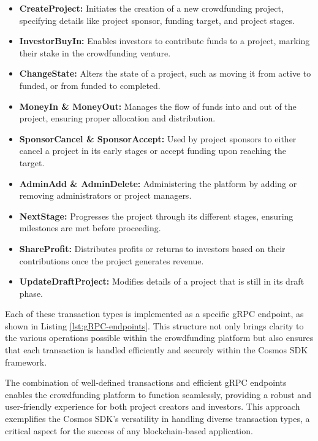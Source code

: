 \begin{itemize}
    \item \textbf{CreateProject:} Initiates the creation of a new crowdfunding project, specifying details like project sponsor, funding target, and project stages.
    \item \textbf{InvestorBuyIn:} Enables investors to contribute funds to a project, marking their stake in the crowdfunding venture.
    \item \textbf{ChangeState:} Alters the state of a project, such as moving it from active to funded, or from funded to completed.
    \item \textbf{MoneyIn \& MoneyOut:} Manages the flow of funds into and out of the project, ensuring proper allocation and distribution.
    \item \textbf{SponsorCancel \& SponsorAccept:} Used by project sponsors to either cancel a project in its early stages or accept funding upon reaching the target.
    \item \textbf{AdminAdd \& AdminDelete:} Administering the platform by adding or removing administrators or project managers.
    \item \textbf{NextStage:} Progresses the project through its different stages, ensuring milestones are met before proceeding.
    \item \textbf{ShareProfit:} Distributes profits or returns to investors based on their contributions once the project generates revenue.
    \item \textbf{UpdateDraftProject:} Modifies details of a project that is still in its draft phase.
\end{itemize}

Each of these transaction types is implemented as a specific gRPC endpoint, as shown in Listing \ref{lst:gRPC-endpoints}. This structure not only brings clarity to the various operations possible within the crowdfunding platform but also ensures that each transaction is handled efficiently and securely within the Cosmos SDK framework.

The combination of well-defined transactions and efficient gRPC endpoints enables the crowdfunding platform to function seamlessly, providing a robust and user-friendly experience for both project creators and investors. This approach exemplifies the Cosmos SDK's versatility in handling diverse transaction types, a critical aspect for the success of any blockchain-based application.

